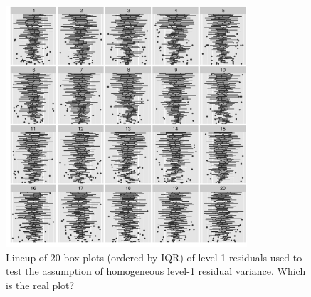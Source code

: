 \documentclass[12pt]{article}
\begin{document}
\begin{figure}[hbt]
	\centering
	\includegraphics[width=0.8\textwidth]{radon_cyclone10.pdf}
	\caption{\label{fig:goodcyclone} Lineup of 20 box plots (ordered by IQR) of level-1 residuals used to test the assumption of homogeneous level-1 residual variance.  Which is the real plot?}
\end{figure}
\end{document}
